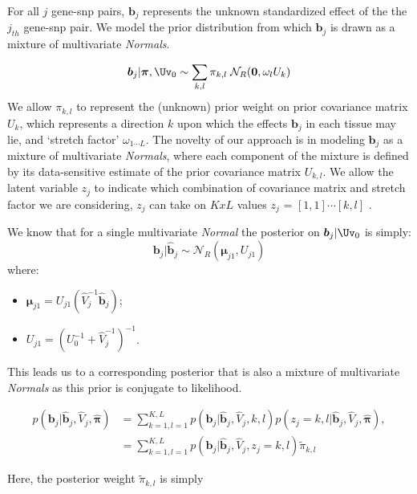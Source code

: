 \documentclass[10pt]{article}
\newcommand{\Norm}{{\mathcal{N}}} %
\begin{document}
 For all $j$  gene-snp pairs, $\bm{b}_{j}$ represents the unknown standardized effect of the the $j_{th}$ gene-snp pair. We model the prior distribution from which $\bm{b}_{j}$ is drawn as a mixture of multivariate {\it Normals}.
 
 \begin{equation}
  \label{prior_b_mixt_grid}
  \bm{b}_{j} | \bm{\pi},\Uv_0 \sim \sum_{k,l} \pi_{k,l} \; \Norm_R(\bm{0}, \omega_l U_{k})
\end{equation}
We allow  $\pi_{k,l}$ to represent the (unknown) prior weight on prior covariance matrix $U_{k}$, which represents a direction $k$ upon which the effects $\bm{b}_{j}$ in each tissue may lie, and `stretch factor' $\omega_{1\cdots L}$. The novelty of our approach is in modeling $\bm{b}_{j}$ as a mixture of multivariate {\it Normals}, where each component of the mixture is defined by its data-sensitive estimate of the prior covariance matrix $U_{k,l}$. We allow the latent variable $z_{j}$ to indicate which combination of covariance matrix and stretch factor we are considering,  $z_{j}$ can take on $KxL$ values $z_{j}$ = $[1,1] \cdots[k,l]$ .

We know that for a single multivariate {\it Normal}  the posterior on  $\bm{b}_{j} | \Uv_0$ is  simply: 
\[
\bm{b}_{j} | \hat{\bm{b}}_{j} \sim \Norm_R(\bm{\mu}_{j1}, U_{j1})
\]
where:
\begin{itemize}
\item $\bm{\mu}_{j1} = U_{j1} (\hat{V}_{j}^{-1} \hat{\bm{b}}_{j})$;
\item $U_{j1} = (U_{0}^{-1} + \hat{V}_{j}^{-1})^{-1}$.
\end{itemize}


This leads us to a corresponding posterior that is also a mixture of multivariate {\it Normals} as this prior is conjugate to likelihood.

\begin{equation}
\begin{aligned}
  \label{eq:mixpost}
p(\bm{b}_{j} | \hat{\bm{b}}_{j}, \hat{V}_{j}, \hat{\bm{\pi}} )
&= \sum_{k=1,l=1}^{K,L} p(\bm{b}_{j} | \hat{\bm{b}}_{j}, \hat{V}_{j}, k, l) p(z_{j}=k,l | \hat{\bm{b}}_{j}, \hat{V}_{j}, \hat{\bm{\pi} }),%
 \\
&= \sum_{k=1,l=1}^{K,L} p(\bm{b}_{j} | \hat{\bm{b}}_{j}, \hat{V}_{j}, z_{j}=k,l)%
\tilde \pi_{k,l}
\end{aligned}
\end{equation}

Here, the posterior weight $\tilde \pi_{k,l}$ is simply 
\end{document}
